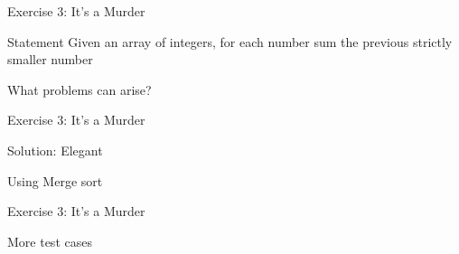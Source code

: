 \documentclass{beamer}
\begin{document}
\begin{frame}{Exercise 3: It's a Murder}
  
  \begin{overlayarea}{\textwidth}{\textheight}
  \begin{block}{Statement}
    Given an array of integers, for each number sum the previous strictly smaller number 
  \end{block}
  
  \begin{example}
  \end{example}
  
  \begin{block}{What problems can arise?}
  \end{block}
  \end{overlayarea}
  
\end{frame}

\begin{frame}[fragile]{Exercise 3: It's a Murder}
  
  \begin{code}{Solution: Elegant}
    \begin{PseudoCode}
Using Merge sort
    \end{PseudoCode}
  \end{code}
  
\end{frame}


\begin{frame}{Exercise 3: It's a Murder}
  \begin{exampleblock}{More test cases}
    \\
        
    \medskip
    \\
  \end{exampleblock}
\end{frame}
\end{document}
